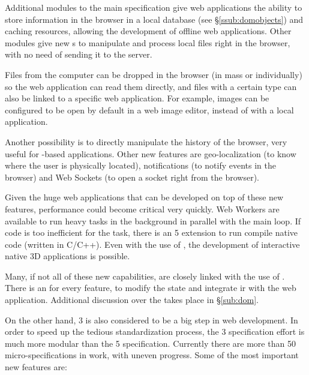 Additional modules to the main specification give web applications the ability to store information in the browser in a local database (see \S\vref{ssub:domobjects}) and caching resources, allowing the development of offline web applications.
Other modules give new s to manipulate and process local files right in the browser, with no need of sending it to the server.

Files from the computer can be dropped in the browser (in mass or individually) so the web application can read them directly, and files with a certain  type can also be linked to a specific web application.
For example, images can be configured to be open by default in a web image editor, instead of with a local application.

Another possibility is to directly manipulate the history of the browser, very useful for -based applications.
Other new features are geo-localization (to know where the user is physically located), notifications (to notify events in the browser) and Web Sockets (to open a socket right from the browser).

Given the huge web applications that can be developed on top of these new features, performance could become critical very quickly.
Web Workers are available to run heavy tasks in the background in parallel with the main loop.
If  code is too inefficient for the task, there is an  5 extension to run compile native code (written in C/C++).
Even with the use of , the development of interactive native 3D applications is possible.

Many, if not all of these new capabilities, are closely linked with the use of .
There is an  for every feature, to modify the state and integrate ir with the web application.
Additional discussion over the  takes place in \S\ref{sub:dom}.

On the other hand,  3 is also considered to be a big step in web development.
In order to speed up the tedious standardization process, the  3 specification effort is much more modular than the  5 specification.
Currently there are more than 50 micro-specifications in work, with uneven progress.
Some of the most important new features are:

